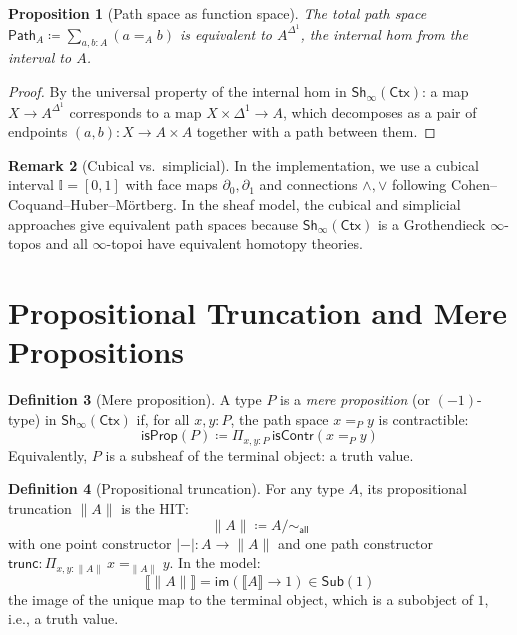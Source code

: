 \documentclass[11pt,a4paper]{report}
\theoremstyle{definition}
\newtheorem{definition}{Definition}[chapter]
\newtheorem{remark}[definition]{Remark}
\theoremstyle{plain}
\newtheorem{proposition}[definition]{Proposition}
\newcommand{\den}[1]{\llbracket #1 \rrbracket}
\newcommand{\Path}{\mathsf{Path}}
\newcommand{\interval}{\mathbb{I}}
\newcommand{\defeq}{\coloneqq}
\newcommand{\Ctx}{\mathsf{Ctx}}
\newcommand{\Sh}{\mathsf{Sh}}
\begin{document}
\begin{proposition}[Path space as function space]
The total path space $\Path_A \defeq \sum_{a,b:A}(a =_A b)$ is equivalent to
$A^{\Delta^1}$, the internal hom from the interval to $A$.
\end{proposition}
\begin{proof}
By the universal property of the internal hom in $\Sh_\infty(\Ctx)$: a map
$X \to A^{\Delta^1}$ corresponds to a map $X \times \Delta^1 \to A$, which
decomposes as a pair of endpoints $(a, b) : X \to A \times A$ together with a
path between them.
\end{proof}

\begin{remark}[Cubical vs.\ simplicial]
In the implementation, we use a cubical interval $\interval = [0, 1]$ with
face maps $\partial_0, \partial_1$ and connections $\wedge, \vee$ following
Cohen--Coquand--Huber--M\"ortberg.  In the sheaf model, the cubical and
simplicial approaches give equivalent path spaces because $\Sh_\infty(\Ctx)$
is a Grothendieck $\infty$-topos and all $\infty$-topoi have equivalent
homotopy theories.
\end{remark}


\section{Propositional Truncation and Mere Propositions}

\begin{definition}[Mere proposition]
\label{def:mere-prop}
A type $P$ is a \emph{mere proposition} (or $(-1)$-type) in $\Sh_\infty(\Ctx)$
if, for all $x, y : P$, the path space $x =_P y$ is contractible:
\[
  \mathsf{isProp}(P) \defeq \Pi_{x,y:P}\, \mathsf{isContr}(x =_P y)
\]
Equivalently, $P$ is a subsheaf of the terminal object: a truth value.
\end{definition}

\begin{definition}[Propositional truncation]
\label{def:prop-trunc}
For any type $A$, its propositional truncation $\|A\|$ is the HIT:
\[
  \|A\| \defeq A / {\sim_{\mathsf{all}}}
\]
with one point constructor $|{-}| : A \to \|A\|$ and one path constructor
$\mathsf{trunc} : \Pi_{x,y:\|A\|}\, x =_{\|A\|} y$.  In the model:
\[
  \den{\|A\|} = \mathsf{im}(\den{A} \to 1) \in \mathsf{Sub}(1)
\]
the image of the unique map to the terminal object, which is a subobject of
$1$, i.e., a truth value.
\end{definition}
\end{document}
